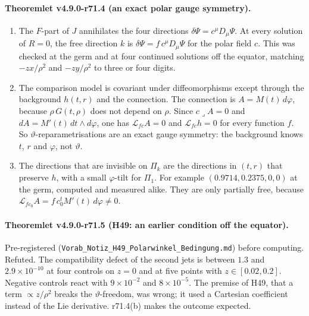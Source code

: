 \paragraph{Theoremlet v4.9.0-r71.4 (an exact polar gauge symmetry).}
\begin{enumerate}[leftmargin=2em]
\item[(a)] The \(F\)-part of \(J\) annihilates the four directions \(\delta\Psi=c^\mu D_\mu\Psi\).  At every solution of \(R=0\),
the free direction \(k\) is \(\delta\Psi=f\,c^\mu D_\mu\Psi\) for the polar field \(c\).  This was checked at the germ and at four
continued solutions off the equator, matching \(-zx/\rho^2\) and \(-zy/\rho^2\) to three or four digits.
\item[(b)] The comparison model is covariant under diffeomorphisms except through the background \(h(t,r)\) and the connection.
The connection is \(A=M(t)\,d\varphi\), because \(\rho\,G(t,\rho)\) does not depend on \(\rho\).  Since \(c\lrcorner A=0\) and
\(dA=M'(t)\,dt\wedge d\varphi\), one has \(\mathcal L_{fc}A=0\) and \(\mathcal L_{fc}h=0\) for every function \(f\).  So
\(\vartheta\)-reparametrisations are an exact gauge symmetry: the background knows \(t\), \(r\) and \(\varphi\), not \(\vartheta\).
\item[(c)] The directions that are invisible on \(\Pi_k\) are the directions in \((t,r)\) that preserve \(h\), with a small
\(\varphi\)-tilt for \(\Pi_1\).  For example \((0.9714,0.2375,0,0)\) at the germ, computed and measured alike.  They are only
partially free, because \(\mathcal L_{fc_0}A=f\,c_0^t M'(t)\,d\varphi\neq0\).
\end{enumerate}

\paragraph{Theoremlet v4.9.0-r71.5 (H49: an earlier condition off the equator).}
Pre-registered (\texttt{Vorab\_Notiz\_H49\_Polarwinkel\_Bedingung.md}) before computing.  Refuted.  The compatibility defect of the
second jets is between \(1.3\) and \(2.9\times10^{-10}\) at four controls on \(z=0\) and at five points with
\(z\in[0.02,0.2]\).  Negative controls react with \(9\times10^{-2}\) and \(8\times10^{-5}\).  The premise of H49, that a term
\(\propto z/\rho^2\) breaks the \(\vartheta\)-freedom, was wrong; it used a Cartesian coefficient instead of the Lie derivative.
r71.4(b) makes the outcome expected.

